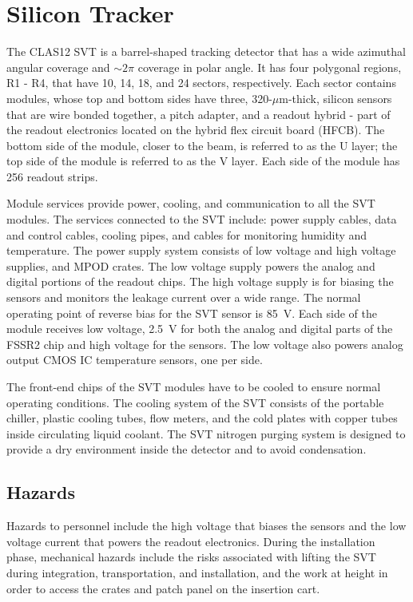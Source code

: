 \section{Silicon Tracker}

The CLAS12 SVT is a barrel-shaped tracking detector that has a wide azimuthal angular 
coverage and $\sim 2\pi$ coverage in polar angle. It has four polygonal regions, R1 - R4, 
that have 10, 14, 18, and 24 sectors, respectively. Each sector contains modules, whose top 
and bottom sides have three, 320-$\mu$m-thick, silicon sensors that are wire bonded together, 
a pitch adapter, and a readout hybrid - part of the readout electronics located on the hybrid 
flex circuit board (HFCB). The bottom side of the module, closer to the beam, is referred to 
as the U layer; the top side of the module is referred to as the V layer. Each side of the 
module has 256 readout strips. 

Module services provide power, cooling, and communication to all the SVT modules. The services 
connected to the SVT include: power supply cables, data and control cables, cooling pipes, and 
cables for monitoring humidity and temperature. The power supply system consists of low voltage 
and high voltage supplies, and MPOD crates. The low voltage supply powers the analog and digital 
portions of the readout chips. The high voltage supply is for biasing the sensors and monitors 
the leakage current over a wide range. The normal operating point of reverse bias for the SVT 
sensor is 85~V. Each side of the module receives low voltage, 2.5~V for both the analog and 
digital parts of the FSSR2 chip and high voltage for the sensors. The low voltage also powers 
analog output CMOS IC temperature sensors, one per side.

The front-end chips of the SVT modules have to be cooled to ensure normal operating conditions. 
The cooling system of the SVT consists of the portable chiller, plastic cooling tubes, flow
meters, and the cold plates with copper tubes inside circulating liquid coolant. The SVT 
nitrogen purging system is designed to provide a dry environment inside the detector and to 
avoid condensation.

\subsection{Hazards} 

Hazards to personnel include the high voltage that biases the sensors and the low voltage 
current that powers the readout electronics. During the installation phase, mechanical hazards 
include the risks associated with lifting the SVT during integration, transportation, and 
installation, and the work at height in order to access the crates and patch panel on the 
insertion cart. 

